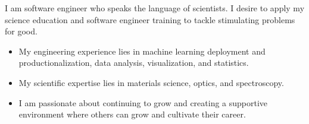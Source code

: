 

\begin{cvparagraph}
I am software engineer who speaks the language of scientists. I desire to apply
my science education and software engineer training to tackle stimulating problems
for good.
\begin{itemize}
    \item{ 
        My engineering experience lies in machine learning deployment and productionalization,
        data analysis, visualization, and statistics.
    }

    \item {
        My scientific expertise lies in materials science, optics, and spectroscopy.
    }

    \item {
        I am passionate about continuing to grow and creating a supportive
        environment where others can grow and cultivate their career.
    }
\end{itemize}
\end{cvparagraph}
